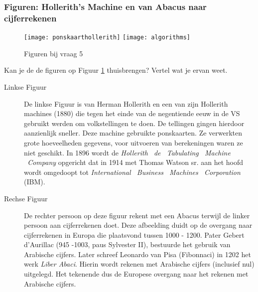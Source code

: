\documentclass[../main.tex]{subfiles}
\begin{document}
\subsubsection{Figuren: Hollerith's Machine en van Abacus naar cijferrekenen}

\begin{figure}[ht!]
	\begin{center}
		\texttt{[image: ponskaarthollerith]}
		\texttt{[image: algorithms]}
	\end{center}
	\caption{Figuren bij vraag 5}
	\label{fig:vraag5}
\end{figure}

\begin{question}
Kan je de de figuren op Figuur \ref{fig:vraag5} thuisbrengen? Vertel wat je ervan weet.
\end{question}
\begin{description}
	\item[Linkse Figuur] De linkse Figuur is van Herman Hollerith en een van zijn Hollerith machines (1880) die tegen het einde van de negentiende eeuw in de VS gebruikt werden om volkstellingen te doen. De tellingen gingen hierdoor aanzienlijk sneller.
	Deze machine gebruikte ponskaarten. Ze verwerkten grote hoeveelheden gegevens, voor uitvoeren van berekeningen waren ze niet geschikt.
	In 1896 wordt de \emph{Hollerith  de  Tabulating  Machine  Company} opgericht dat in 1914 met Thomas Watson sr. aan het hoofd wordt omgedoopt tot \emph{International  Business  Machines  Corporation} (IBM).
	\item[Rechse Figuur] De rechter persoon op deze figuur rekent met een Abacus terwijl de linker persoon aan cijferrekenen doet. Deze afbeelding duidt op de overgang naar cijferrekenen in Europa die plaatsvond tussen 1000 - 1200. Pater Gebert d'Aurillac (945 -1003, paus Sylvester II), bestuurde het gebruik van Arabische cijfers. Later schreef Leonardo van Pisa (Fibonnaci) in 1202 het werk \emph{Liber Abaci}. Hierin wordt rekenen met Arabische cijfers (inclusief nul) uitgelegd. Het tekenende dus de Europese overgang naar het rekenen met Arabische cijfers.
\end{description}
\end{document}
